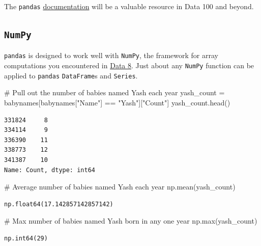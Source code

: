 \documentclass[
  letterpaper,
  DIV=11,
  numbers=noendperiod]{scrreprt}
\newenvironment{Shaded}{\begin{snugshade}}{\end{snugshade}}
\newcommand{\BuiltInTok}[1]{\textcolor[rgb]{0.00,0.23,0.31}{#1}}
\newcommand{\CommentTok}[1]{\textcolor[rgb]{0.37,0.37,0.37}{#1}}
\newcommand{\NormalTok}[1]{\textcolor[rgb]{0.00,0.23,0.31}{#1}}
\newcommand{\OperatorTok}[1]{\textcolor[rgb]{0.37,0.37,0.37}{#1}}
\newcommand{\StringTok}[1]{\textcolor[rgb]{0.13,0.47,0.30}{#1}}
\begin{document}
The \texttt{pandas}
\href{https://pandas.pydata.org/docs/reference/index.html}{documentation}
will be a valuable resource in Data 100 and beyond.

\subsection{\texorpdfstring{\texttt{NumPy}}{NumPy}}\label{numpy}

\texttt{pandas} is designed to work well with \texttt{NumPy}, the
framework for array computations you encountered in
\href{https://www.data8.org/su23/reference/\#array-functions-and-methods}{Data
8}. Just about any \texttt{NumPy} function can be applied to
\texttt{pandas} \texttt{DataFrame}s and \texttt{Series}.

\begin{Shaded}
\begin{Highlighting}[]
\CommentTok{\# Pull out the number of babies named Yash each year}
\NormalTok{yash\_count }\OperatorTok{=}\NormalTok{ babynames[babynames[}\StringTok{"Name"}\NormalTok{] }\OperatorTok{==} \StringTok{"Yash"}\NormalTok{][}\StringTok{"Count"}\NormalTok{]}
\NormalTok{yash\_count.head()}
\end{Highlighting}
\end{Shaded}

\begin{verbatim}
331824     8
334114     9
336390    11
338773    12
341387    10
Name: Count, dtype: int64
\end{verbatim}

\begin{Shaded}
\begin{Highlighting}[]
\CommentTok{\# Average number of babies named Yash each year}
\NormalTok{np.mean(yash\_count)}
\end{Highlighting}
\end{Shaded}

\begin{verbatim}
np.float64(17.142857142857142)
\end{verbatim}

\begin{Shaded}
\begin{Highlighting}[]
\CommentTok{\# Max number of babies named Yash born in any one year}
\NormalTok{np.}\BuiltInTok{max}\NormalTok{(yash\_count)}
\end{Highlighting}
\end{Shaded}

\begin{verbatim}
np.int64(29)
\end{verbatim}
\end{document}
